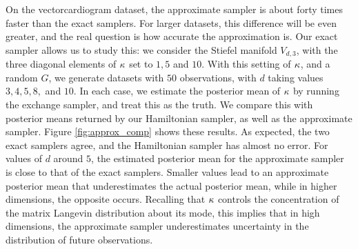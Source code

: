 On the vectorcardiogram dataset, the approximate sampler 
is about forty times faster than the exact samplers. For larger
datasets, this difference will be even greater, and the real question is how accurate
the approximation is. Our exact sampler allows us to study this: %
we consider the Stiefel manifold $V_{d,3}$,
with the three diagonal elements of $\kappa$ set to $1, 5 $ and $10$. With this setting of $\kappa$, and
a random $G$, we generate datasets with $50$ observations, with $d$ taking values $3, 4, 5, 8,$ and $10$.
In each case, we estimate the posterior mean of $\kappa$ by running the exchange sampler, and treat this as the
truth. We compare this with posterior means returned by our Hamiltonian sampler, as well as the approximate sampler.  Figure \ref{fig:approx_comp}
shows these results. 
As expected, the two exact samplers agree, and the Hamiltonian sampler has almost no error.
For values of $d$ around $5$, the estimated posterior mean for the approximate sampler is close to that of the exact samplers. Smaller values lead to an approximate posterior mean that underestimates the actual posterior mean,
while in higher dimensions, the opposite occurs. Recalling that $\kappa$ controls the concentration of the matrix Langevin distribution about its
mode, this implies that in high dimensions, the approximate sampler underestimates uncertainty in the distribution of future observations.
